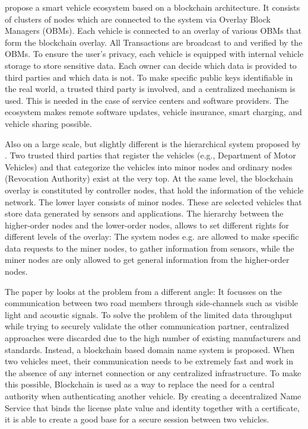 \cite{DorriSteger2017} propose a smart vehicle ecosystem based on a blockchain architecture. It consists of clusters of nodes which are connected to the system via Overlay Block Managers (OBMs). Each vehicle is connected to an overlay of various OBMs that form the blockchain overlay. All Transactions are broadcast to and verified by the OBMs.
To ensure the user's privacy, each vehicle is equipped with internal vehicle storage to store sensitive data. Each owner can decide which data is provided to third parties and which data is not.
To make specific public keys identifiable in the real world, a trusted third party is involved, and a centralized mechanism is used. This is needed in the case of service centers and software providers. The ecosystem makes remote software updates, vehicle insurance, smart charging, and vehicle sharing possible.

Also on a large scale, but slightly different is the hierarchical system proposed by \cite{Sharma2017}. Two trusted third parties that register the vehicles (e.g., Department of Motor Vehicles) and that categorize the vehicles into minor nodes and ordinary nodes (Revocation Authority) exist at the very top. At the same level, the blockchain overlay is constituted by controller nodes, that hold the information of the vehicle network. The lower layer consists of minor nodes. These are selected vehicles that store data generated by sensors and applications. 
The hierarchy between the higher-order nodes and the lower-order nodes, allows to set different rights for different levels of the overlay: The system nodes e.g. are allowed to make specific data requests to the miner nodes, to gather information from sensors, while the miner nodes are only allowed to get general information from the higher-order nodes.

The paper by \cite{Rowan2017} looks at the problem from a different angle: It focusses on the communication between two road members through side-channels such as visible light and acoustic signals. To solve the problem of the limited data throughput while trying to securely validate the other communication partner, centralized approaches were discarded due to the high number of existing manufacturers and standards. Instead, a blockchain based domain name system is proposed.
When two vehicles meet, their communication needs to be extremely fast and work in the absence of any internet connection or any centralized infrastructure. 
To make this possible, Blockchain is used as a way to replace the need for a central authority when authenticating another vehicle. By creating a decentralized Name Service that binds the license plate value and identity together with a certificate, it is able to create a good base for a secure session between two vehicles.

